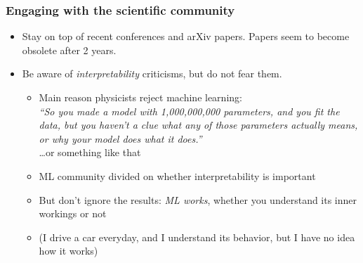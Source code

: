 \begin{frame}
    \frametitle{Engaging with the scientific community}

    \begin{itemize}
        \item<+-> \alert{Stay on top of recent conferences and arXiv papers.}
        Papers seem to become obsolete after 2 years.
        \item<+-> \alert{Be aware of \emph{interpretability} criticisms, but do not fear them.}
        \begin{itemize}[<+->]
            \item Main reason physicists reject machine learning: \\[1ex]

            \emph{``So you made a model with 1,000,000,000 parameters, and you fit the data, but you haven't a clue what any of those parameters actually means, or why your model does what it does.''} \\[1ex]

            \ldots or something like that
            \item<+-> ML community divided on whether interpretability is important
            \item But don't ignore the results: \emph{ML works}, whether you understand its inner workings or not
            \item (I drive a car everyday, and I understand its behavior, but I have no idea how it works)
        \end{itemize}
    \end{itemize}
\end{frame}

